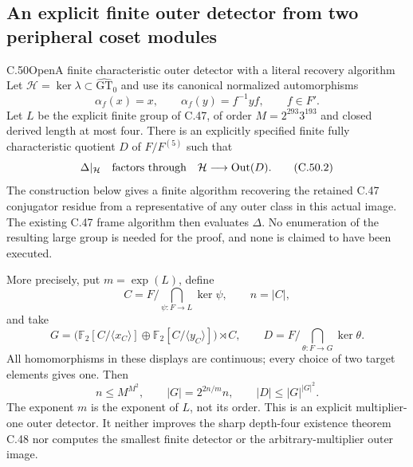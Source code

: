 \subsection{An explicit finite outer detector from two peripheral coset modules}

\begin{statement}{C.50}{Open}{A finite characteristic outer detector with a literal recovery algorithm}
Let $\mathcal H=\ker\lambda\subset\widehat{\mathrm{GT}}_0$ and
use its canonical normalized automorphisms
\[
             \alpha_f(x)=x,\qquad \alpha_f(y)=f^{-1}yf,
                    \qquad f\in F'.                     \tag{C.50.1}
\]
Let $L$ be the explicit finite group of C.47, of order
$M=2^{293}3^{193}$ and closed derived length at most four.
There is an explicitly specified finite fully characteristic quotient
$D$ of $F/F^{(5)}$ such that
\[
       \Delta|_{\mathcal H}\quad\hbox{factors through}\quad
              \mathcal H\longrightarrow\operatorname{Out}(D).
                                                               \tag{C.50.2}
\]
The construction below gives a finite algorithm recovering the retained
C.47 conjugator residue from a representative of any outer class in
this actual image. The existing C.47 frame algorithm then evaluates
$\Delta$. No enumeration of the resulting large group is needed for
the proof, and none is claimed to have been executed.

More precisely, put $m=\exp(L)$, define
\[
 C=F\Big/\bigcap_{\psi:F\to L}\ker\psi,
                    \qquad n=|C|,
                                                               \tag{C.50.3}
\]
and take
\[
 G=\bigl(\mathbb F_2[C/\langle x_C\rangle]
          \oplus\mathbb F_2[C/\langle y_C\rangle]\bigr)\rtimes C,
 \qquad
 D=F\Big/\bigcap_{\theta:F\to G}\ker\theta.           \tag{C.50.4}
\]
All homomorphisms in these displays are continuous; every choice of
two target elements gives one. Then
\[
 n\le M^{M^2},\qquad |G|=2^{2n/m}n,
                    \qquad |D|\le |G|^{|G|^2}.        \tag{C.50.5}
\]
The exponent $m$ is the exponent of $L$, not its order.
This is an explicit multiplier-one outer detector. It neither
improves the sharp depth-four existence theorem C.48 nor computes
the smallest finite detector or the arbitrary-multiplier outer image.
\end{statement}

